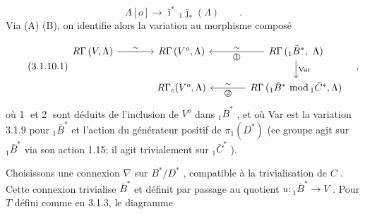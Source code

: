 \begin{equation*}
\Lambda[o] \longrightarrow \bar{\imath}^*\, {}_1\bar{\jmath}_*(\Lambda) \qquad .
\end{equation*}
Via (A) (B), on identifie alors la variation au morphisme composé

\begin{equation}\tag{3.1.10.1}
\begin{tikzcd}[column sep=large]
R\Gamma\,(V,\Lambda) \arrow[r, "\sim"] & R\Gamma\,(V^o,\Lambda) & R\Gamma\,({}_1\bar{B}^*,\ \Lambda) \arrow[l, "\sim"', "\text{\textcircled{1}}"] \arrow[d, "\mathrm{Var}"] \\
{} & R\Gamma_c(V^o,\Lambda) & R\Gamma\,({}_1\bar{B}^*\ \mathrm{mod}\,{}_1\bar{C}^*,\Lambda) \arrow[l, "\sim"', "\text{\textcircled{2}}"]
\end{tikzcd}\quad ,
\end{equation}
où \textcircled{1} et \textcircled{2} sont déduits de l'inclusion de $V^o$ dans ${}_1\bar{B}^*$ , et où Var est la variation 3.1.9 pour ${}_1\bar{B}^*$ et l'action du générateur positif de $\pi_1(D^*)$ (ce groupe agit sur ${}_1\bar{B}^*$ via son action 1.15; il agit trivialement sur ${}_1\bar{C}^*$ ).

Choisissons une connexion $\nabla$ sur $B^*/D^*$ , compatible à la trivialisation de $C$ . Cette connexion trivialise $\bar{B}^*$ et définit par passage au quotient $u : {}_1\bar{B}^* \longrightarrow V$ . Pour $T$ défini comme en 3.1.3, le diagramme 


